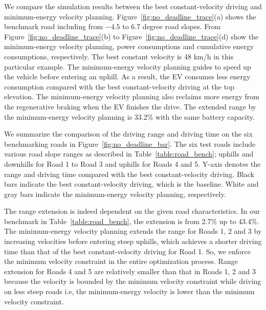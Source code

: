 \documentclass{IEEEtran}
\begin{document}
We compare the simulation results between the best constant-velocity driving and minimum-energy velocity planning. Figure~\ref{fig:no_deadline_trace}(a) shows the benchmark road including from $-4.5$ to 6.7 degree road slopes. From Figure~\ref{fig:no_deadline_trace}(b) to Figure~\ref{fig:no_deadline_trace}(d) show the minimum-energy velocity planning, power consumptions and cumulative energy consumptions, respectively. The best constant velocity is 48 km/h in this particular example. The minimum-energy velocity planning guides to speed up the vehicle before entering an uphill. As a result, the EV consumes less energy consumption compared with the best constant-velocity driving at the top elevation. The minimum-energy velocity planning also reclaims more energy from the regenerative braking when the EV finishes the drive. The extended range by the minimum-energy velocity planning is 33.2\% with the same battery capacity.

We summarize the comparison of the driving range and driving time on the six benchmarking roads in Figure~\ref{fig:no_deadline_bar}. The six test roads include various road slope ranges as described in Table~\ref{table:road_bench}; uphills and downhills for Road 1 to Road 3 and uphills for Roads 4 and 5. Y-axis denotes the range and driving time compared with the best constant-velocity driving. Black bars indicate the best constant-velocity driving, which is the baseline. White and gray bars indicate the minimum-energy velocity planning, respectively.

The range extension is indeed dependent on the given road characteristics. In our benchmark in Table~\ref{table:road_bench}, the extension is from 2.7\% up to 43.4\%. The minimum-energy velocity planning extends the range for Roads 1, 2 and  3 by increasing velocities before entering steep uphills, which achieves a shorter driving time than that of the best constant-velocity driving for Road 1. So, we enforce the minimum velocity constraint in the entire optimization process. Range extension for Roads 4 and 5 are relatively smaller than that in Roads 1, 2 and 3 because the velocity is bounded by the minimum velocity constraint while driving on less steep roads i.e, the minimum-energy velocity is lower than the minimum velocity constraint.

\end{document}
